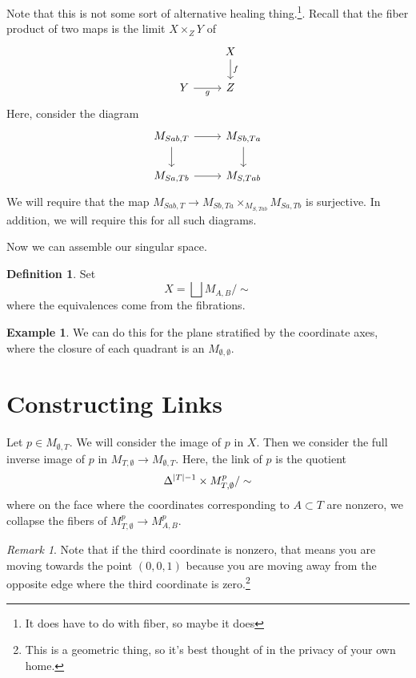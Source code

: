 \documentclass[leqno, openany]{memoir}
\theoremstyle{definition}
\newtheorem{defn}[thm]{Definition}
\newtheorem{exm}[thm]{Example}
\theoremstyle{remark}
\newtheorem{rmk}[thm]{Remark}
\theoremstyle{plain}
\theoremstyle{definition}
\theoremstyle{remark}
\begin{document}
Note that this is not some sort of alternative healing thing.\footnote{It does have to do with fiber, so maybe it does}. Recall that the fiber product of two maps is the limit $X \times_Z Y$ of
\begin{equation*}
\begin{tikzcd}
    & X \arrow{d}{f} \\
    Y \arrow[swap]{r}{g} & Z
\end{tikzcd}
\end{equation*}
Here, consider the diagram
\begin{equation*}
\begin{tikzcd}
    M_{Sab,T} \arrow{r} \arrow{d} & M_{Sb,Ta} \arrow{d} \\
    M_{Sa,Tb} \arrow{r} & M_{S, Tab}
\end{tikzcd}
\end{equation*}
We will require that the map $M_{Sab,T} \to M_{Sb,Ta} \times_{M_{S, Tab}} M_{Sa,Tb}$ is surjective. In addition, we will require this for all such diagrams.

Now we can assemble our singular space.
\begin{defn}
    Set 
    \[ X = \bigsqcup M_{A,B} / \sim \]
    where the equivalences come from the fibrations.
\end{defn}

\begin{exm}
    We can do this for the plane stratified by the coordinate axes, where the closure of each quadrant is an $M_{\emptyset, \emptyset}$.
\end{exm}

\section{Constructing Links}%
\label{sec:constructing_links}

Let $p \in M_{\emptyset, T}$. We will consider the image of $p$ in $X$. Then we consider the full inverse image of $p$ in $M_{T,\emptyset} \to M_{\emptyset, T}$. Here, the link of $p$ is the quotient
\[ \Delta^{\abs{T} - 1} \times M_{T,\emptyset}^p / \sim \]
where on the face where the coordinates corresponding to $A \subset T$ are nonzero, we collapse the fibers of $M_{T,\emptyset}^p \to M_{A,B}^p$.

\begin{rmk}
    Note that if the third coordinate is nonzero, that means you are moving towards the point $(0,0,1)$ because you are moving away from the opposite edge where the third coordinate is zero.\footnote{This is a geometric thing, so it's best thought of in the privacy of your own home.}
\end{rmk}
\end{document}
